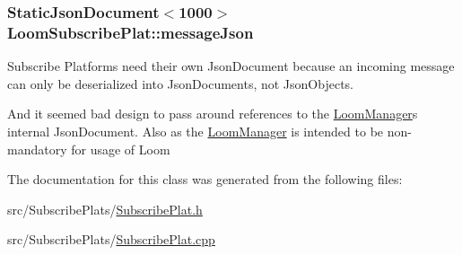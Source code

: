 \subsubsection[{\texorpdfstring{message\+Json}{messageJson}}]{\setlength{\rightskip}{0pt plus 5cm}Static\+Json\+Document$<$1000$>$ Loom\+Subscribe\+Plat\+::message\+Json\hspace{0.3cm}{\ttfamily [protected]}}\hypertarget{class_loom_subscribe_plat_ae06b201b8f5928c0434beeb29f0c6ac2}{}\label{class_loom_subscribe_plat_ae06b201b8f5928c0434beeb29f0c6ac2}


Subscribe Platforms need their own Json\+Document because an incoming message can only be deserialized into Json\+Documents, not Json\+Objects. 

And it seemed bad design to pass around references to the \hyperlink{class_loom_manager}{Loom\+Manager}\textquotesingle{}s internal Json\+Document. Also as the \hyperlink{class_loom_manager}{Loom\+Manager} is intended to be non-\/mandatory for usage of Loom 

The documentation for this class was generated from the following files\+:\begin{DoxyCompactItemize}
\item 
src/\+Subscribe\+Plats/\hyperlink{_subscribe_plat_8h}{Subscribe\+Plat.\+h}\item 
src/\+Subscribe\+Plats/\hyperlink{_subscribe_plat_8cpp}{Subscribe\+Plat.\+cpp}\end{DoxyCompactItemize}
